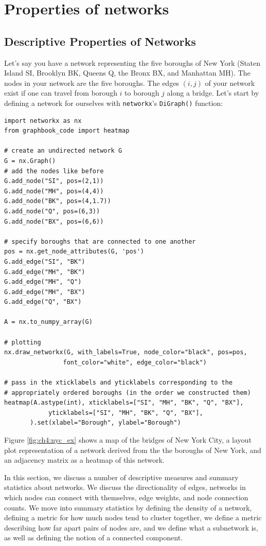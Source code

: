 \section{Properties of networks}
\label{sec:ch4:prop-net}

\subsection{Descriptive Properties of Networks}

Let's say you have a network representing the five boroughs of New York (Staten Island SI, Brooklyn BK, Queens Q, the Bronx BX, and Manhattan MH). The nodes in your network are the five boroughs. The edges $(i,j)$ of your network exist if one can travel from borough $i$ to borough $j$ along a bridge. Let's start by defining a network for ourselves with \texttt{networkx}'s \texttt{DiGraph()} function:


\begin{lstlisting}[style=python]
import networkx as nx
from graphbook_code import heatmap

# create an undirected network G
G = nx.Graph()
# add the nodes like before
G.add_node("SI", pos=(2,1))
G.add_node("MH", pos=(4,4))
G.add_node("BK", pos=(4,1.7))
G.add_node("Q", pos=(6,3))
G.add_node("BX", pos=(6,6))

# specify boroughs that are connected to one another
pos = nx.get_node_attributes(G, 'pos')
G.add_edge("SI", "BK")
G.add_edge("MH", "BK")
G.add_edge("MH", "Q")
G.add_edge("MH", "BX")
G.add_edge("Q", "BX")

A = nx.to_numpy_array(G)

# plotting
nx.draw_networkx(G, with_labels=True, node_color="black", pos=pos,
                font_color="white", edge_color="black")

# pass in the xticklabels and yticklabels corresponding to the
# appropriately ordered boroughs (in the order we constructed them)
heatmap(A.astype(int), xticklabels=["SI", "MH", "BK", "Q", "BX"],
            yticklabels=["SI", "MH", "BK", "Q", "BX"], 
       ).set(xlabel="Borough", ylabel="Borough")
\end{lstlisting}

Figure \ref{fig:ch4:nyc_ex} shows a map of the bridges of New York City, a layout plot representation of a network derived from the the boroughs of New York, and an adjacency matrix as a heatmap of this network.

In this section, we discuss a number of descriptive measures and summary statistics about networks. We discuss the directionality of edges, networks in which nodes can connect with themselves, edge weights, and node connection counts. We move into summary statistics by defining the density of a network, defining a metric for how much nodes tend to cluster together, we define a metric describing how far apart pairs of nodes are, and we define what a subnetwork is, as well as defining the notion of a connected component.

